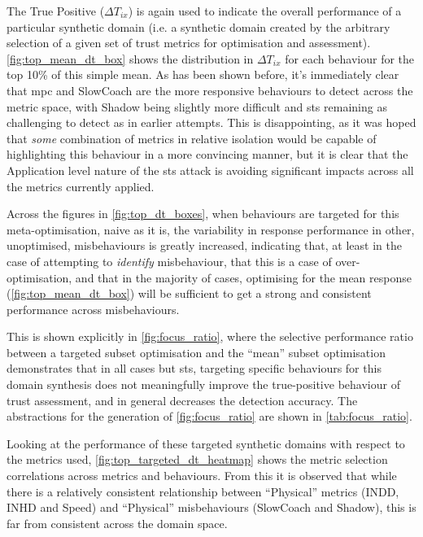 The True Positive ($\Delta T_{ix}$) is again used to indicate the overall performance of a particular synthetic domain (i.e. a synthetic domain created by the arbitrary selection of a given set of trust metrics for optimisation and assessment).
\autoref{fig:top_mean_dt_box} shows the distribution in $\Delta T_{ix}$ for each behaviour for the top 10\% of this simple mean.
As has been shown before, it's immediately clear that \gls{mpc} and SlowCoach are the more responsive behaviours to detect across the metric space, with Shadow being slightly more difficult and \gls{sts} remaining as challenging to detect as in earlier attempts.
This is disappointing, as it was hoped that \emph{some} combination of metrics in relative isolation would be capable of highlighting this behaviour in a more convincing manner, but it is clear that the Application level nature of the \gls{sts} attack is avoiding significant impacts across all the metrics currently applied.

Across the figures in \autoref{fig:top_dt_boxes}, when behaviours are targeted for this meta-optimisation, naive as it is, the variability in response performance in other, unoptimised, misbehaviours is greatly increased, indicating that, at least in the case of attempting to \emph{identify} misbehaviour, that this is a case of over-optimisation, and that in the majority of cases, optimising for the mean response (\autoref{fig:top_mean_dt_box}) will be sufficient to get a strong and consistent performance across misbehaviours.

This is shown explicitly in \autoref{fig:focus_ratio}, where the selective performance ratio between a targeted subset optimisation and the ``mean'' subset optimisation demonstrates that in all cases but \gls{sts}, targeting specific behaviours for this domain synthesis does not meaningfully improve the true-positive behaviour of trust assessment, and in general decreases the detection accuracy.
The abstractions for the generation of \autoref{fig:focus_ratio} are shown in \autoref{tab:focus_ratio}.

Looking at the performance of these targeted synthetic domains with respect to the metrics used, \autoref{fig:top_targeted_dt_heatmap} shows the metric selection correlations across metrics and behaviours.
From this it is observed that while there is a relatively consistent relationship between ``Physical'' metrics (INDD, INHD and Speed) and ``Physical'' misbehaviours (SlowCoach and Shadow), this is far from consistent across the domain space. 

